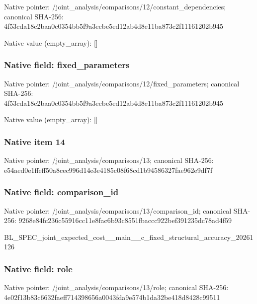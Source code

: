 \documentclass[10pt,a4paper]{article}
\begin{document}
Native pointer: /joint\_analysis/comparis\allowbreak{}ons/12/constant\_dependen\allowbreak{}cies; canonical SHA-256: 4f53cda18c2baa0c0354bb5f\allowbreak{}9a3ecbe5ed12ab4d8e11ba87\allowbreak{}3c2f11161202b945



Native value (empty\_array): []



\subsubsection{Native field: fixed\_parameters}


Native pointer: /joint\_analysis/comparis\allowbreak{}ons/12/fixed\_parameters; canonical SHA-256: 4f53cda18c2baa0c0354bb5f\allowbreak{}9a3ecbe5ed12ab4d8e11ba87\allowbreak{}3c2f11161202b945



Native value (empty\_array): []



\subsubsection{Native item 14}


Native pointer: /joint\_analysis/comparisons/13; canonical SHA-256: e54aed0e1ffeff50a8cec996\allowbreak{}d14e3e4185c08f68cd1b9458\allowbreak{}6327fae962e9df7f



\subsubsection{Native field: comparison\_id}


Native pointer: /joint\_analysis/comparis\allowbreak{}ons/13/comparison\_id; canonical SHA-256: 9268e84fc236c55916cc11e8\allowbreak{}fac6b93c8551fbaccc922bef\allowbreak{}391235dc78ad4f59


BL\_SPEC\_joint\_expected\_c\allowbreak{}ost\_\_main\_\_c\_fixed\_struc\allowbreak{}tural\_accuracy\_20261126


\subsubsection{Native field: role}


Native pointer: /joint\_analysis/comparisons/13/role; canonical SHA-256: 4e02f13b83c6632faeff7143\allowbreak{}98656a0043fda9e574b1da32\allowbreak{}be418d8428c99511
\end{document}
